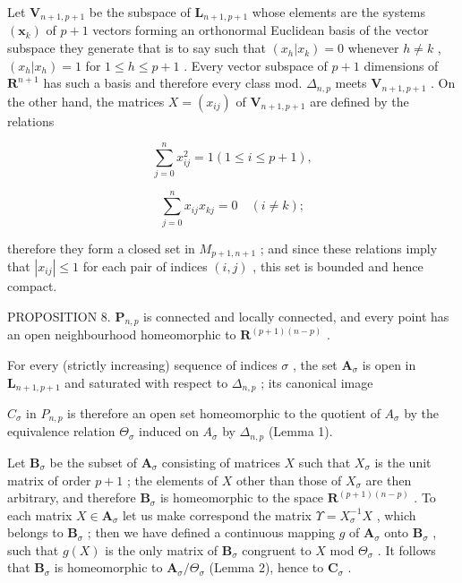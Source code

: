 Let \(\mathbf{V}_{n+1, p+1}\) be the subspace of \(\mathbf{L}_{n+1, p+1}\) whose elements are the systems \((\boldsymbol{x}_k)\) of \(p + 1\) vectors forming an orthonormal Euclidean basis of the vector subspace they generate that is to say such that \((x_h | x_k) = 0\) whenever \(h \neq k\) , \((x_h | x_h) = 1\) for \(1 \leqslant h \leqslant p + 1\) . Every vector subspace of \(p + 1\) dimensions of \(\mathbf{R}^{n+1}\) has such a basis and therefore every class mod. \(\Delta_{n,p}\) meets \(\mathbf{V}_{n+1, p+1}\) . On the other hand, the matrices \(X = (x_{ij})\) of \(\mathbf{V}_{n+1, p+1}\) are defined by the relations

\[
\sum_ {j = 0} ^ {n} x _ {i j} ^ {2} = 1 (1 \leqslant i \leqslant p + 1),
\]

\[
\sum_ {j = 0} ^ {n} x _ {i j} x _ {k j} = 0 \quad (i \neq k);
\]

therefore they form a closed set in \(M_{p+1, n+1}\) ; and since these relations imply that \(|x_{ij}| \leqslant 1\) for each pair of indices \((i, j)\) , this set is bounded and hence compact.

PROPOSITION 8. \(\mathbf{P}_{n,p}\) is connected and locally connected, and every point has an open neighbourhood homeomorphic to \(\mathbf{R}^{(p+1)(n-p)}\) .

For every (strictly increasing) sequence of indices \(\sigma\) , the set \(\mathbf{A}_{\sigma}\) is open in \(\mathbf{L}_{n+1, p+1}\) and saturated with respect to \(\Delta_{n,p}\) ; its canonical image

\(C_{\sigma}\) in \(P_{n,p}\) is therefore an open set homeomorphic to the quotient of \(A_{\sigma}\) by the equivalence relation \(\Theta_{\sigma}\) induced on \(A_{\sigma}\) by \(\Delta_{n,p}\) (Lemma 1).

Let \(\mathbf{B}_{\sigma}\) be the subset of \(\mathbf{A}_{\sigma}\) consisting of matrices \(X\) such that \(X_{\sigma}\) is the unit matrix of order \(p + 1\) ; the elements of \(X\) other than those of \(X_{\sigma}\) are then arbitrary, and therefore \(\mathbf{B}_{\sigma}\) is homeomorphic to the space \(\mathbf{R}^{(p + 1)(n - p)}\) . To each matrix \(X \in \mathbf{A}_{\sigma}\) let us make correspond the matrix \(\Upsilon = X_{\sigma}^{-1}X\) , which belongs to \(\mathbf{B}_{\sigma}\) ; then we have defined a continuous mapping \(g\) of \(\mathbf{A}_{\sigma}\) onto \(\mathbf{B}_{\sigma}\) , such that \(g(X)\) is the only matrix of \(\mathbf{B}_{\sigma}\) congruent to \(X\) mod \(\Theta_{\sigma}\) . It follows that \(\mathbf{B}_{\sigma}\) is homeomorphic to \(\mathbf{A}_{\sigma}/\Theta_{\sigma}\) (Lemma 2), hence to \(\mathbf{C}_{\sigma}\) .

